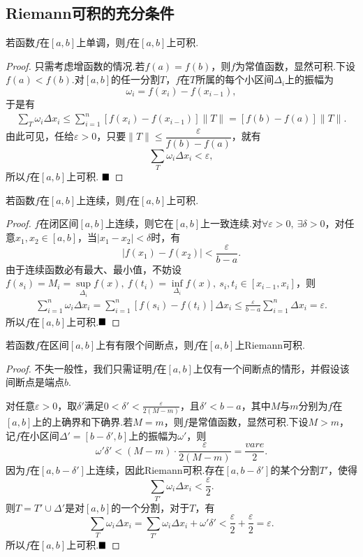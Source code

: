\subsection{Riemann可积的充分条件}
\begin{theorem}
	若函数$f$在$\left[a,b\right]$上单调，则$f$在$\left[a,b\right]$上可积.
\end{theorem}
\begin{proof}
	只需考虑增函数的情况.若$f(a)=f(b)$，则$f$为常值函数，显然可积.下设$f(a)<f(b)$.对$\left[a,b\right]$的任一分割$T$，$f$在$T$所属的每个小区间$\Delta_i$上的振幅为
	$$\omega_i=f(x_i)-f(x_{i-1}),$$
	于是有
	\begin{align*}
		\sum_{T}\omega_i\Delta x_i
		\leqslant\sum_{i=1}^{n}\left[f(x_i)-f(x_{i-1})\right]\|T\|
		=\left[f(b)-f(a)\right]\|T\|.
	\end{align*}
	由此可见，任给$\varepsilon>0$，只要$\|T\|\leqslant\dfrac{\varepsilon}{f(b)-f(a)}$，就有
	$$\sum_{T}\omega_i\Delta x_i<\varepsilon,$$
	所以$f$在$\left[a,b\right]$上可积.
	$\hfill\blacksquare$
\end{proof}
\begin{theorem}
	若函数$f$在$\left[a,b\right]$上连续，则$f$在$\left[a,b\right]$上可积.
\end{theorem}
\begin{proof}
	$f$在闭区间$\left[a,b\right]$上连续，则它在$\left[a,b\right]$上一致连续.对$\forall\varepsilon>0,\ \exists\delta>0$，对任意$x_1,x_2\in\left[a,b\right]$，当$|x_1-x_2|<\delta$时，有
	$$|f(x_1)-f(x_2)|<\frac{\varepsilon}{b-a}.$$
	由于连续函数必有最大、最小值，不妨设$f(s_i)=M_i=\sup\limits_{\Delta_i}f(x),\ f(t_i)=\inf\limits_{\Delta_i}f(x),\ s_i,t_i\in\left[x_{i-1},x_i\right]$，则
	\begin{align*}
		\sum_{i=1}^{n}\omega_i\Delta x_i
		=\sum_{i=1}^{n}\left[f(s_i)-f(t_i)\right]\Delta x_i
		\leqslant\frac{\varepsilon}{b-a}\sum_{i=1}^{n}\Delta x_i=\varepsilon.
	\end{align*}
	所以$f$在$\left[a,b\right]$上可积.$\hfill\blacksquare$
\end{proof}
\begin{theorem}
	若函数$f$在区间$\left[a,b\right]$上有有限个间断点，则$f$在$\left[a,b\right]$上Riemann可积.
\end{theorem}
\begin{proof}
	不失一般性，我们只需证明$f$在$\left[a,b\right]$上仅有一个间断点的情形，并假设该间断点是端点$b$.
	
	对任意$\varepsilon>0$，取$\delta'$满足$0<\delta'<\frac{\varepsilon}{2(M-m)}$，且$\delta'<b-a$，其中$M$与$m$分别为$f$在$\left[a,b\right]$上的上确界和下确界.若$M=m$，则$f$是常值函数，显然可积.下设$M>m$，记$f$在小区间$\Delta'=\left[b-\delta',b\right]$上的振幅为$\omega'$，则
	$$\omega'\delta'<(M-m)\cdot\frac{\varepsilon}{2(M-m)}=\frac{vare	}{2}.$$
	因为$f$在$\left[a,b-\delta'\right]$上连续，因此Riemann可积.存在$\left[a,b-\delta'\right]$的某个分割$T'$，使得
	$$\sum_{T'}\omega_i\Delta x_i<\frac{\varepsilon}{2}.$$
	则$T=T'\cup\Delta'$是对$\left[a,b\right]$的一个分割，对于$T$，有
	$$\sum_{T}\omega_i\Delta x_i=\sum_{T'}\omega_i\Delta x_i+\omega'\delta'<\frac{\varepsilon}{2}+\frac{\varepsilon}{2}=\varepsilon.$$
	所以$f$在$\left[a,b\right]$上可积.$\hfill\blacksquare$
\end{proof}

